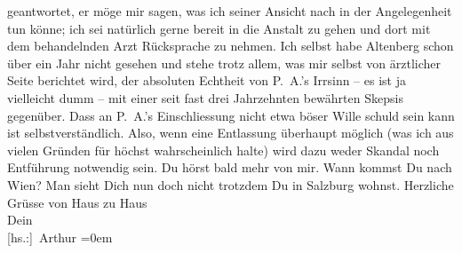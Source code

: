 \begin{ledgroupsized}[t]{13cm}
               geantwortet, er möge mir sagen, was ich seiner Ansicht nach in der Angelegenheit tun
               könne; ich sei natürlich gerne bereit in die Anstalt zu gehen und dort mit dem
               behandelnden Arzt
               Rücksprache zu nehmen. Ich selbst habe Altenberg schon über ein Jahr nicht gesehen und stehe trotz allem, was mir
               selbst von ärztlicher Seite berichtet wird, der absoluten Echtheit von P. A.’s Irr{\pb}sinn – es ist ja
               vielleicht dumm – mit einer seit fast drei Jahrzehnten bewährten Skepsis gegenüber.
               Dass an P. A.’s Einschliessung nicht etwa böser
               Wille schuld sein kann ist selbstverständlich. Also, wenn eine Entlassung überhaupt
               möglich (was ich aus vielen Gründen für höchst wahrscheinlich halte) wird dazu weder
               Skandal noch Entführung notwendig sein. Du hörst bald mehr von mir. Wann kommst Du
               nach Wien? Man sieht Dich nun doch nicht trotzdem
               Du in Salzburg wohnst.\pend
           \pstart
           Herzliche Grüsse von Haus zu Haus{\\[\baselineskip]}Dein{\\[\baselineskip]}\spacefill\mbox{{[}hs.:{]} Arthur}\pend
           \leftskip=0em{}
         
         \endnumbering{}\end{ledgroupsized}  \newcommand{\dateiname}{L02122}\newcommand{\titel}{Arthur Schnitzler an Hermann Bahr, 18. 4. 1913}\newcommand{\editorInnen}{ Kurt Ifkovits,  Martin Anton Müller}
      